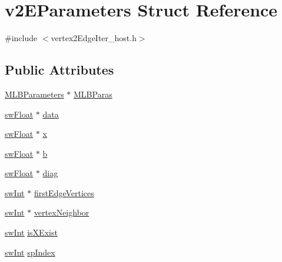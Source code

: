 \hypertarget{structv2EParameters}{
\section{v2EParameters Struct Reference}
\label{structv2EParameters}
}


{\ttfamily \#include $<$vertex2EdgeIter\_\-host.h$>$}\subsection*{Public Attributes}
\begin{DoxyCompactItemize}
\item 
\hyperlink{structMLBParameters}{MLBParameters} $\ast$ \hyperlink{structv2EParameters_ab06f8d41c20e729616a6cf3a2cfeae92}{MLBParas}
\item 
\hyperlink{swMacro_8h_a4ce60b1aa82e56b7372553a6a5bf2c0b}{swFloat} $\ast$ \hyperlink{structv2EParameters_a10bb380921e17e9a54562e88bb6d6dcf}{data}
\item 
\hyperlink{swMacro_8h_a4ce60b1aa82e56b7372553a6a5bf2c0b}{swFloat} $\ast$ \hyperlink{structv2EParameters_a8730bf625a64be132bcd572f933be257}{x}
\item 
\hyperlink{swMacro_8h_a4ce60b1aa82e56b7372553a6a5bf2c0b}{swFloat} $\ast$ \hyperlink{structv2EParameters_ac0a7ddfe8902e7df101f0285ebc065a2}{b}
\item 
\hyperlink{swMacro_8h_a4ce60b1aa82e56b7372553a6a5bf2c0b}{swFloat} $\ast$ \hyperlink{structv2EParameters_a514a501f701f14d7889c215c1524a451}{diag}
\item 
\hyperlink{swMacro_8h_a113cf5f6b5377cdf3fac6aa4e443e9aa}{swInt} $\ast$ \hyperlink{structv2EParameters_a61d2d7370ade2dea0171ed268cac2167}{firstEdgeVertices}
\item 
\hyperlink{swMacro_8h_a113cf5f6b5377cdf3fac6aa4e443e9aa}{swInt} $\ast$ \hyperlink{structv2EParameters_a74ce747488c691e6a1ff538a9cd6690b}{vertexNeighbor}
\item 
\hyperlink{swMacro_8h_a113cf5f6b5377cdf3fac6aa4e443e9aa}{swInt} \hyperlink{structv2EParameters_a95ab8c79b3944c72d11a99d0f025a321}{isXExist}
\item 
\hyperlink{swMacro_8h_a113cf5f6b5377cdf3fac6aa4e443e9aa}{swInt} \hyperlink{structv2EParameters_acbfa41217e7218a1089d4a585ba44b23}{spIndex}
\end{DoxyCompactItemize}


